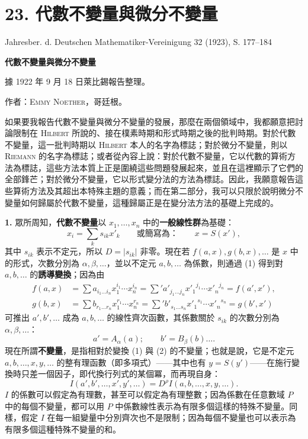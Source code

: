 \documentclass[11pt]{article}
\newcommand{\D}{\mathit D}
\newcommand{\srcemph}[1]{\textbf{#1}}
\newcommand{\srcname}[1]{\textsc{#1}}
\newcommand{\srcnumdisplay}[2]{\begin{equation}\tag{#1}#2\end{equation}}
\begin{document}
\section*{23. 代數不變量與微分不變量}
\begin{center}
Jahresber. d. Deutschen Mathematiker-Vereinigung 32 (1923), S. 177--184
\end{center}

\begin{center}
{\Large\bfseries 代數不變量與微分不變量}\par
\vspace{0.45em}
據 1922 年 9 月 18 日萊比錫報告整理。\par
\vspace{1.0em}
作者：\textsc{Emmy Noether}，哥廷根。
\end{center}

\begingroup
\renewcommand{\thefootnote}{\arabic{footnote})}
\setcounter{footnote}{0}

如果要我報告代數不變量與微分不變量的發展，那麼在兩個領域中，我都願意把討論限制在 \srcname{Hilbert} 所說的、接在樸素時期和形式時期之後的批判時期。對於代數不變量，這一批判時期以 \srcname{Hilbert} 本人的名字為標誌；對於微分不變量，則以 \srcname{Riemann} 的名字為標誌；或者從內容上說：對於代數不變量，它以代數的算術方法為標誌，這些方法本質上正是圍繞這些問題發展起來，並且在這裡顯示了它們的全部鋒芒；對於微分不變量，它以形式變分法的方法為標誌。因此，我願意報告這些算術方法及其超出本特殊主題的意義；而在第二部分，我可以只限於說明微分不變量如何歸屬於代數不變量，這種歸屬正是在變分法方法的基礎上完成的。

\textbf{1.} 眾所周知，\srcemph{代數不變量}以 $x_1,\ldots,x_n$ 中的\srcemph{一般線性群}為基礎：
\srcnumdisplay{1}{x_i=\sum_k s_{ik}x'_k
\qquad\text{或簡寫為：}\qquad x=S(x'),}
其中 $s_{ik}$ 表示不定元，所以 $\D=|s_{ik}|$ 非零。現在若 $f(a,x),g(b,x),\ldots$ 是 $x$ 中的形式，次數分別為 $\alpha,\beta,\ldots$，並以不定元 $a,b,\ldots$ 為係數，則通過 (1) 得到對 $a,b,\ldots$ 的\srcemph{誘導變換}；因為由
\[
\begin{aligned}
f(a,x)&=\sum a_{i_1\ldots i_n}x_1^{i_1}\cdots x_n^{i_n}
      =\sum{}' a'_{j_1\ldots j_n}{x'_1}^{j_1}\cdots {x'_n}^{j_n}
      =f(a',x'),\\
g(b,x)&=\sum b_{r_1\ldots r_n}x_1^{r_1}\cdots x_n^{r_n}
      =\sum{}' b'_{s_1\ldots s_n}{x'_1}^{s_1}\cdots {x'_n}^{s_n}
      =g(b',x')
\end{aligned}
\]
可推出 $a',b',\ldots$ 成為 $a,b,\ldots$ 的線性齊次函數，其係數關於 $s_{ik}$ 的次數分別為 $\alpha,\beta,\ldots$：
\srcnumdisplay{2}{a'=A_\alpha(a);\qquad b'=B_\beta(b)\ldots .}
現在所謂\srcemph{不變量}，是指相對於變換 (1) 與 (2) 的不變量；也就是說，它是不定元 $a,b,\ldots,x,y,\ldots$ 的整有理函數（即多項式）——其中也有 $y=S(y')$——在施行變換時只差一個因子，即代換行列式的某個冪，而再現自身：
\srcnumdisplay{3}{I(a',b',\ldots,x',y',\ldots)=\D^\rho I(a,b,\ldots,x,y,\ldots).}
$I$ 的係數可以假定為有理數，甚至可以假定為有理整數；因為係數在任意數域 $P$ 中的每個不變量，都可以用 $P$ 中係數線性表示為有限多個這樣的特殊不變量。同樣，假定 $I$ 在每一組變量中分別齊次也不是限制；因為每個不變量也可以表示為有限多個這種特殊不變量的和。
\end{document}
